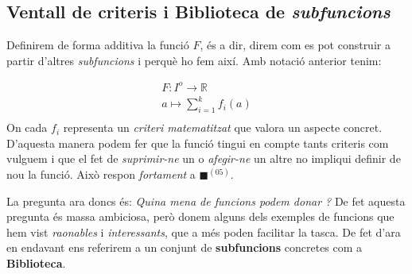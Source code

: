 \documentclass[10pt,twocolumn]{article}
\newcommand{\R}{\ensuremath{\mathbb{R}}}
\begin{document}
\subsection{Ventall de criteris i Biblioteca de \textit{subfuncions}}
Definirem de forma additiva la funció $F$, és a dir, direm com es pot construir a partir d'altres \textit{subfuncions} i perquè ho fem així. Amb notació anterior tenim:

$$
\begin{matrix}
F: I^o \longrightarrow \R \qquad \quad  \\
a\longmapsto \displaystyle \sum_{i=1}^{k}f_i(a) \\
\end{matrix}
$$
On cada $f_i$ representa un \textit{criteri matematitzat} que  valora un aspecte concret. D'aquesta manera podem fer que la funció tingui en compte tants criteris com vulguem i que el fet de \textit{suprimir-ne} un  o \textit{afegir-ne} un altre no impliqui definir de nou la funció.
Això respon \textit{fortament} a {\color{violet!60}$\blacksquare$}$^{(05)}$.

La pregunta ara doncs és: \textit{Quina mena de funcions podem donar ?} De fet aquesta pregunta és massa ambiciosa, però donem alguns dels exemples de funcions que hem vist \textit{raonables} i \textit{interessants}, que a més poden facilitar la tasca. De fet d'ara en endavant ens referirem a un conjunt de \textbf{subfuncions} concretes com a \textbf{Biblioteca}.
\vspace{3mm}
\end{document}
